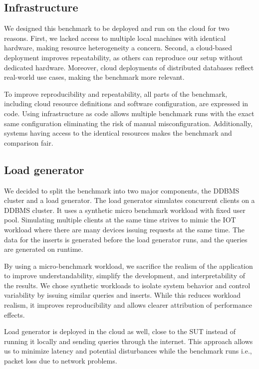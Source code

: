 \subsection{Infrastructure}
We designed this benchmark to be deployed and run on the cloud for two reasons.
First, we lacked access to multiple local machines with identical hardware, making resource heterogeneity a concern.
Second, a cloud-based deployment improves repeatability, as others can reproduce our setup without dedicated hardware.
Moreover, cloud deployments of distributed databases reflect real-world use cases, making the benchmark more relevant.

To improve reproducibility and repeatability, all parts of the benchmark, including cloud resource definitions and software configuration, are expressed in code.
Using infrastructure as code allows multiple benchmark runs with the exact same configuration eliminating the risk of manual misconfiguration.
Additionally, systems having access to the identical resources makes the benchmark and comparison fair.

\subsection{Load generator}
We decided to split the benchmark into two major components, the DDBMS cluster and a load generator.
The load generator simulates concurrent clients on a DDBMS cluster.
It uses a  synthetic micro benchmark workload with fixed user pool.
Simulating multiple clients at the same time strives to mimic the IOT workload where there are many devices issuing requests at the same time.
The data for the inserts is generated before the load generator runs, and the queries are generated on runtime.

By using a micro-benchmark workload, we sacrifice the realism of the application to improve understandability, simplify the development, and interpretability of the results.
We chose synthetic workloads to isolate system behavior and control variability by issuing similar queries and inserts.
While this reduces workload realism, it improves reproducibility and allows clearer attribution of performance effects.

Load generator is deployed in the cloud as well, close to the SUT instead of running it locally and sending queries through the internet.
This approach allows us to minimize latency and potential disturbances while the benchmark runs i.e., packet loss due to network problems.

